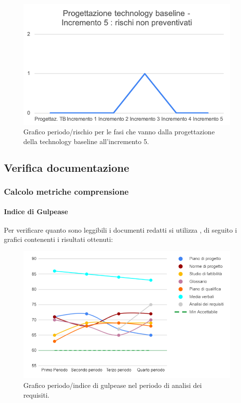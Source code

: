 	\begin{figure}[H]
			\centering
			\includegraphics[width=0.8\linewidth]{./res/images/RischiNonPrevent_3.png}
			\caption{Grafico periodo/rischio per le fasi che vanno dalla progettazione della technology baseline all'incremento 5.}
			\label{fig:Grafico periodo/rischio per le fasi che vanno dalla progettazione della technology baseline all'incremento 5.}
	\end{figure}
	

\subsection{Verifica documentazione}

\subsubsection{Calcolo metriche comprensione}

\paragraph{Indice di Gulpease}
Per verificare quanto sono leggibili i documenti redatti si utilizza , di seguito i grafici contenenti i risultati ottenuti:

\begin{figure}[H]
	\centering
	\includegraphics[width=0.8\linewidth]{./res/images/gulpease_1.png}
	\caption{Grafico periodo/indice di gulpease nel periodo di analisi dei requisiti.}
	\label{fig:Grafico indice di gulpease periodo di analisi dei requisiti.}
\end{figure}

